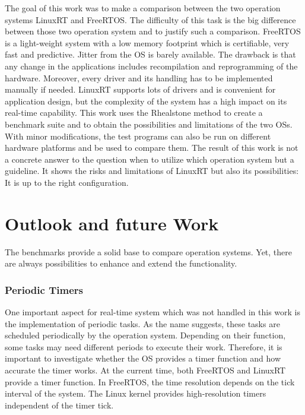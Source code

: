 The goal of this work was to make a comparison between the two operation systems LinuxRT and FreeRTOS. 
The difficulty of this task is the big difference between those two operation system and to justify such a comparison.
FreeRTOS is a light-weight system with a low memory footprint which is certifiable, very fast and predictive. 
Jitter from the \ac{OS} is barely available. 
The drawback is that any change in the applications includes recompilation and reprogramming of the hardware.
Moreover, every driver and its handling has to be implemented manually if needed.
LinuxRT supports lots of drivers and is convenient for application design, but the complexity of the system has a high impact on its real-time capability.
This work uses the Rhealstone method to create a benchmark suite and to obtain the possibilities and limitations of the two \acp{OS}.
With minor modifications, the test programs can also be run on different hardware platforms and be used to compare  them.
The result of this work is not a concrete answer to the question when to utilize which operation system but a guideline.
It shows the risks and limitations of LinuxRT but also its possibilities: It is up to the right configuration. 

\section{Outlook and future Work}
The benchmarks provide a solid base to compare operation systems.
Yet, there are always possibilities to enhance and extend the functionality.

\subsubsection{Periodic Timers}
One important aspect for real-time system which was not handled in this work is the implementation of periodic tasks.
As the name suggests, these tasks are scheduled periodically by the operation system.
Depending on their function, some tasks may need different periods to execute their work.
Therefore, it is important to investigate whether the \ac{OS} provides a timer function and how accurate the timer works.
At the current time, both FreeRTOS and LinuxRT provide a timer function.
In FreeRTOS, the time resolution depends on the tick interval of the system.
The Linux kernel provides high-resolution timers independent of the timer tick.

